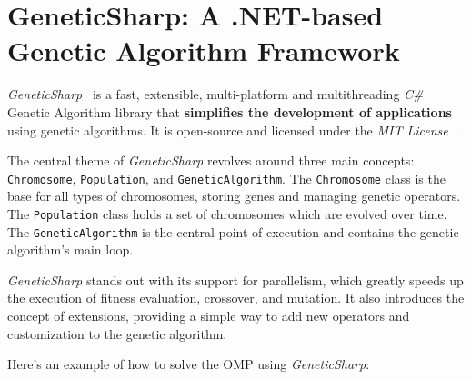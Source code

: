 \section{GeneticSharp: A .NET-based Genetic Algorithm Framework}
\label{sec:sota:geneticsharp}
  \emph{GeneticSharp}~\autocite{giacomelliGeneticSharp2023} is a fast, 
  extensible, multi-platform and multithreading \textit{C\#} Genetic Algorithm 
  library that \textbf{simplifies the development of applications} using 
  genetic algorithms.
  It is open-source and licensed under the \textit{MIT License}~\autocite{MITLicense2006}.

  The central theme of \textit{GeneticSharp} revolves around three main 
  concepts: \texttt{Chromosome}, 
  \texttt{Population}, and 
  \texttt{GeneticAlgorithm}.
  The \texttt{Chromosome} class is the base for all types of chromosomes, 
  storing genes and managing genetic operators.
  The \texttt{Population} class holds a set of chromosomes which are evolved 
  over time.
  The \texttt{GeneticAlgorithm} is the central point of execution and contains 
  the genetic algorithm's main loop.

  \textit{GeneticSharp} stands out with its support for parallelism, which 
  greatly speeds up the execution of fitness evaluation, crossover, and 
  mutation.
  It also introduces the concept of extensions, providing a simple way to add 
  new operators and customization to the genetic algorithm.

  Here's an example of how to solve the OMP using \textit{GeneticSharp}:

